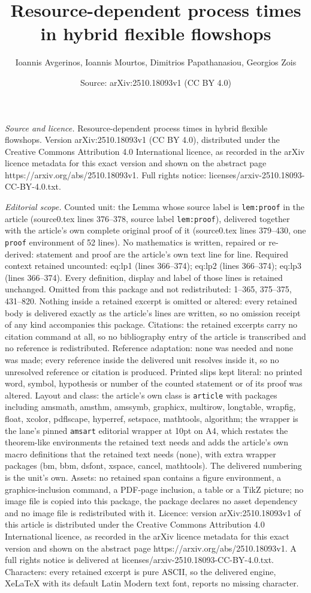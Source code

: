 \documentclass[10pt,a4paper]{amsart}
\title[Resource-dependent process times in hybrid flexible flowshop]{Resource-dependent process times in hybrid flexible flowshops}
\author{Ioannis Avgerinos, Ioannis Mourtos, Dimitrios Papathanasiou, Georgios Zois}
\date{Source: arXiv:2510.18093v1 (CC BY 4.0)}
\begin{document}
\maketitle

\noindent\emph{Source and licence.} Resource-dependent process times in hybrid flexible flowshops. Version arXiv:2510.18093v1 (CC BY 4.0), distributed under the Creative Commons Attribution 4.0 International licence, as recorded in the arXiv licence metadata for this exact version and shown on the abstract page https://arxiv.org/abs/2510.18093v1. Full rights notice: licenses/arxiv-2510.18093-CC-BY-4.0.txt.\par\smallskip

\noindent\textit{Editorial scope.} Counted unit: the Lemma whose source label is \texttt{lem:proof} in the article (source0.tex lines 376--378, source label \texttt{lem:proof}), delivered together with the article's own complete original proof of it (source0.tex lines 379--430, one \texttt{proof} environment of 52 lines). No mathematics is written, repaired or re-derived: statement and proof are the article's own text line for line. Required context retained uncounted: eq:lp1 (lines 366--374); eq:lp2 (lines 366--374); eq:lp3 (lines 366--374). Every definition, display and label of those lines is retained unchanged. Omitted from this package and not redistributed: 1--365, 375--375, 431--820. Nothing inside a retained excerpt is omitted or altered: every retained body is delivered exactly as the article's lines are written, so no omission receipt of any kind accompanies this package. Citations: the retained excerpts carry no citation command at all, so no bibliography entry of the article is transcribed and no reference is redistributed. Reference adaptation: none was needed and none was made; every reference inside the delivered unit resolves inside it, so no unresolved reference or citation is produced. Printed slips kept literal: no printed word, symbol, hypothesis or number of the counted statement or of its proof was altered. Layout and class: the article's own class is \texttt{article} with packages including amsmath, amsthm, amssymb, graphicx, multirow, longtable, wrapfig, float, xcolor, pdflscape, hyperref, setspace, mathtools, algorithm; the wrapper is the lane's pinned \texttt{amsart} editorial wrapper at 10pt on A4, which restates the theorem-like environments the retained text needs and adds the article's own macro definitions that the retained text needs (none), with extra wrapper packages (bm, bbm, dsfont, xspace, cancel, mathtools). The delivered numbering is the unit's own. Assets: no retained span contains a figure environment, a graphics-inclusion command, a PDF-page inclusion, a table or a TikZ picture; no image file is copied into this package, the package declares no asset dependency and no image file is redistributed with it. Licence: version arXiv:2510.18093v1 of this article is distributed under the Creative Commons Attribution 4.0 International licence, as recorded in the arXiv licence metadata for this exact version and shown on the abstract page https://arxiv.org/abs/2510.18093v1. A full rights notice is delivered at licenses/arxiv-2510.18093-CC-BY-4.0.txt. Characters: every retained excerpt is pure ASCII, so the delivered engine, XeLaTeX with its default Latin Modern text font, reports no missing character.
\end{document}
